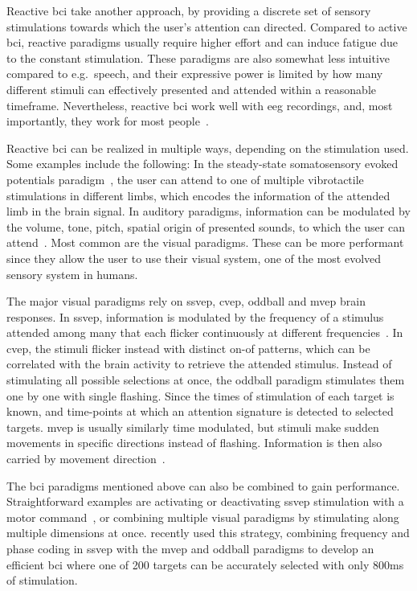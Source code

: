 Reactive \ac{bci} take another approach, by providing a discrete set of
sensory stimulations towards which the user's attention can directed.
Compared to active \ac{bci}, reactive paradigms usually require higher effort
and can induce fatigue due to the constant stimulation.
These paradigms are also somewhat less intuitive compared to e.g.\ speech, and
their expressive power is limited by how many different stimuli can effectively
presented and attended within a reasonable timeframe.
Nevertheless, reactive \ac{bci} work well with \ac{eeg} recordings, and, most
importantly, they work for most people~\cite{Allison2010a,Edlinger2014}.

Reactive \ac{bci} can be realized in multiple ways, depending on the
stimulation used.
Some examples include the following:
In the steady-state somatosensory evoked potentials paradigm~\cite{Petit2021},
the user can attend to one of multiple vibrotactile stimulations in different
limbs, which encodes the information of the attended limb in the brain signal.
In auditory paradigms, information can be modulated by the volume, tone, pitch,
spatial origin of presented sounds, to which the user can
attend~\cite{Kaongoen2017}.
Most common are the visual paradigms.
These can be more performant since they allow the user to use their visual
system, one of the most evolved sensory system in humans.

The major visual paradigms rely on
\ac{ssvep}, \ac{cvep}, oddball and \ac{mvep} brain responses.
In \ac{ssvep}, information is modulated by the frequency of a stimulus attended
among many that each flicker continuously at different
frequencies~\cite{Chen2021}.
In \ac{cvep}, the stimuli flicker instead with distinct on-of patterns, which can
be correlated with the brain activity to retrieve the attended stimulus.
Instead of stimulating all possible selections at once, the oddball paradigm
stimulates them one by one with single flashing.
Since the times of stimulation of each target is known, and time-points at
which an attention signature is detected to selected targets.
\Ac{mvep} is usually similarly time modulated, but stimuli make sudden
movements in specific directions instead of flashing.
Information is then also carried by movement
direction~\cite{Libert2021a,Libert2022}.


The \ac{bci} paradigms mentioned above can also be combined to gain performance.
Straightforward examples are activating or deactivating \ac{ssvep} stimulation
with a motor command~\cite{Neeling2019}, or combining multiple visual paradigms by stimulating
along multiple dimensions at once.
\textcite{Han2023} recently used this strategy, combining frequency and phase
coding in \ac{ssvep} with the \ac{mvep} and oddball paradigms to develop an
efficient \ac{bci} where one of 200 targets can be accurately selected with
only 800ms of stimulation.
